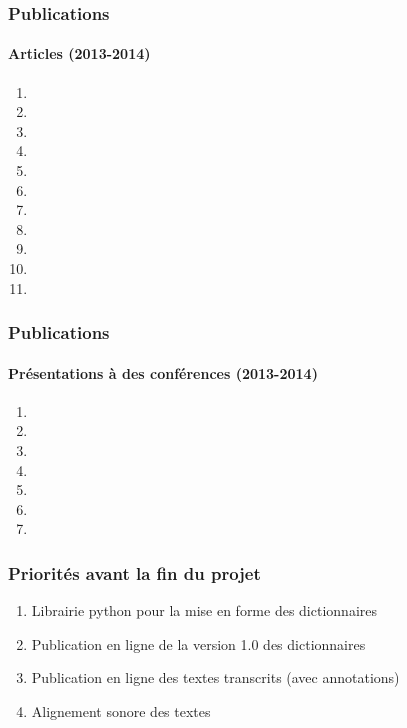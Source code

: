 \documentclass[xcolor=table]{beamer}
\begin{document}
  \begin{frame} 
 \frametitle{Publications}
  \framesubtitle{Articles (2013-2014)}
     
  \tiny
    \begin{enumerate}
\item  {}
\item {}
\item {}
\item {}
\item {}
\item {}
\item {}
\item {}
\item {}
\item {}
\item {}
\end{enumerate}
  \end{frame}      
  
  
    \begin{frame} 
 \frametitle{Publications}
  \framesubtitle{Présentations à des conférences (2013-2014)}
  \tiny
    \begin{enumerate}
\item {}
\item {}
\item {}
\item {}
\item {}
\item  {}
\item {}

 
\end{enumerate}
  \end{frame}      
      \begin{frame} 
 \frametitle{Priorités avant la fin du projet}
 
 \begin{enumerate}[<+->]
\item Librairie python pour la mise en forme des dictionnaires  
\item Publication en ligne de la version 1.0 des dictionnaires   
\item  Publication en ligne des textes transcrits (avec annotations) 
\item  Alignement sonore des textes
\end{enumerate}
 
   \end{frame}      
\end{document}
